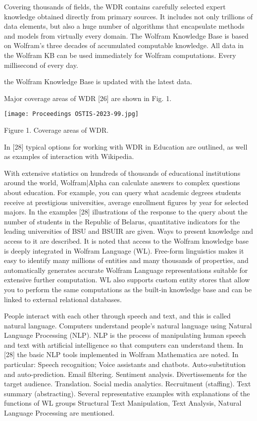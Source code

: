\documentclass{article}
\begin{document}
\begin{multicols}{2}
Covering thousands of fields, the WDR contains carefully selected expert knowledge obtained directly from
primary sources. It includes not only trillions of data elements, but also a huge number of algorithms that encapsulate methods and models from virtually every domain.
The Wolfram Knowledge Base is based on Wolfram’s
three decades of accumulated computable knowledge. All
data in the Wolfram KB can be used immediately for
Wolfram computations. Every millisecond of every day.
\par
\noindent the Wolfram Knowledge Base is updated with the latest
data.
\par
Major coverage areas of WDR [26] are shown in Fig. 1.
\par
\texttt{[image: Proceedings OSTIS-2023-99.jpg]}
\begin{center}
{\tiny Figure 1. Coverage areas of WDR.}
\end{center}
\par
In [28] typical options for working with WDR in
Education are outlined, as well as examples of interaction
with Wikipedia.
\par
With extensive statistics on hundreds of thousands of
educational institutions around the world, Wolfram|Alpha
can calculate answers to complex questions about education. For example, you can query what academic degrees students receive at prestigious universities, average
enrollment figures by year for selected majors. In the
examples [28] illustrations of the response to the query
about the number of students in the Republic of Belarus,
quantitative indicators for the leading universities of BSU
and BSUIR are given. Ways to present knowledge and
access to it are described. It is noted that access to the
Wolfram knowledge base is deeply integrated in Wolfram
Language (WL). Free-form linguistics makes it easy to
identify many millions of entities and many thousands of
properties, and automatically generates accurate Wolfram
Language representations suitable for extensive further
computation. WL also supports custom entity stores that
allow you to perform the same computations as the
built-in knowledge base and can be linked to external
relational databases.
\par
People interact with each other through speech and
text, and this is called natural language. Computers
understand people’s natural language using Natural Language Processing (NLP). NLP is the process of manipulating human speech and text with artificial intelligence
so that computers can understand them. In [28] the basic
NLP tools implemented in Wolfram Mathematica are
noted. In particular: Speech recognition; Voice assistants and chatbots. Auto-substitution and auto-prediction.
Email filtering. Sentiment analysis. Divertissements for
the target audience. Translation. Social media analytics. Recruitment (staffing). Text summary (abstracting).
Several representative examples with explanations of the
functions of WL groups Structural Text Manipulation,
Text Analysis, Natural Language Processing are mentioned.

\end{multicols}
\end{document}
